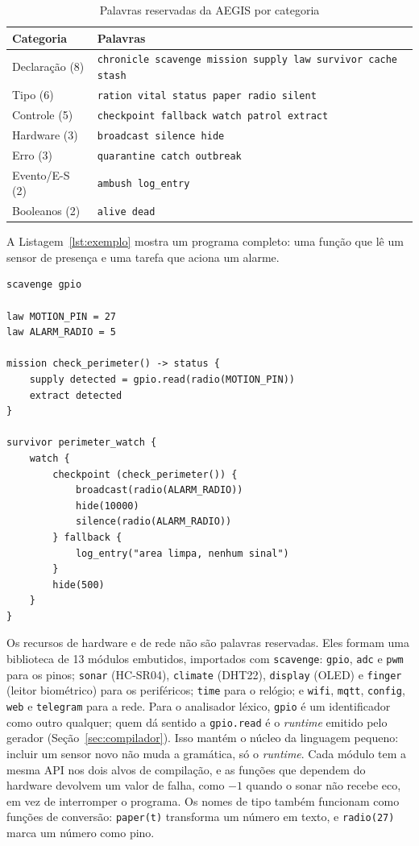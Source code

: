 \documentclass[conference]{IEEEtran}
\begin{document}
\begin{table}[htbp]
\caption{Palavras reservadas da AEGIS por categoria}
\label{tab:palavras}
\centering
\small
\begin{tabular}{@{}lp{5.2cm}@{}}
\toprule
\textbf{Categoria} & \textbf{Palavras} \\
\midrule
Declaração (8) & \texttt{chronicle scavenge mission supply law survivor cache stash} \\
Tipo (6)       & \texttt{ration vital status paper radio silent} \\
Controle (5)   & \texttt{checkpoint fallback watch patrol extract} \\
Hardware (3)   & \texttt{broadcast silence hide} \\
Erro (3)       & \texttt{quarantine catch outbreak} \\
Evento/E-S (2) & \texttt{ambush log\_entry} \\
Booleanos (2)  & \texttt{alive dead} \\
\bottomrule
\end{tabular}
\end{table}

A Listagem~\ref{lst:exemplo} mostra um programa completo: uma função que
lê um sensor de presença e uma tarefa que aciona um alarme.

\begin{lstlisting}[language=AEGIS,caption={Programa de exemplo em AEGIS},label={lst:exemplo}]
scavenge gpio

law MOTION_PIN = 27
law ALARM_RADIO = 5

mission check_perimeter() -> status {
    supply detected = gpio.read(radio(MOTION_PIN))
    extract detected
}

survivor perimeter_watch {
    watch {
        checkpoint (check_perimeter()) {
            broadcast(radio(ALARM_RADIO))
            hide(10000)
            silence(radio(ALARM_RADIO))
        } fallback {
            log_entry("area limpa, nenhum sinal")
        }
        hide(500)
    }
}
\end{lstlisting}

Os recursos de hardware e de rede não são palavras reservadas. Eles
formam uma biblioteca de 13 módulos embutidos, importados com
\texttt{scavenge}: \texttt{gpio}, \texttt{adc} e \texttt{pwm} para os
pinos; \texttt{sonar} (HC-SR04), \texttt{climate} (DHT22),
\texttt{display} (OLED) e \texttt{finger} (leitor biométrico) para os
periféricos; \texttt{time} para o relógio; e \texttt{wifi},
\texttt{mqtt}, \texttt{config}, \texttt{web} e \texttt{telegram} para a
rede. Para o analisador léxico, \texttt{gpio} é um identificador como
outro qualquer; quem dá sentido a \texttt{gpio.read} é o \textit{runtime}
emitido pelo gerador (Seção~\ref{sec:compilador}). Isso mantém o núcleo
da linguagem pequeno: incluir um sensor novo não muda a gramática, só o
\textit{runtime}. Cada módulo tem a mesma API nos dois alvos de
compilação, e as funções que dependem do hardware devolvem um valor de
falha, como $-1$ quando o sonar não recebe eco, em vez de interromper o
programa. Os nomes de tipo também funcionam como funções de conversão:
\texttt{paper(t)} transforma um número em texto, e \texttt{radio(27)}
marca um número como pino.
\end{document}
